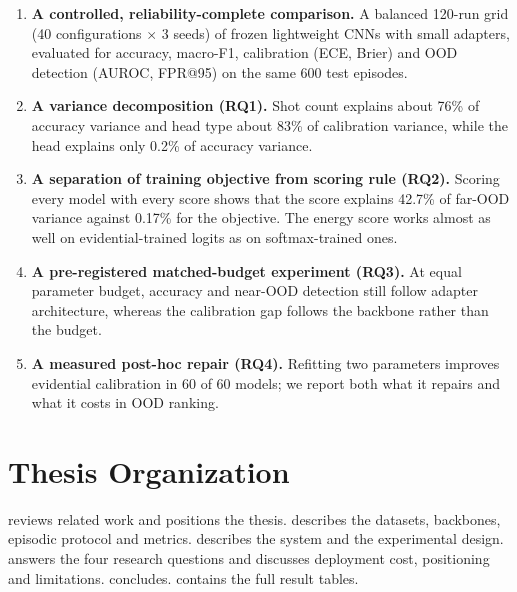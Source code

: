 \begin{enumerate}
\item \textbf{A controlled, reliability-complete comparison.} A balanced 120-run grid (40
configurations $\times$ 3 seeds) of frozen lightweight CNNs with small adapters, evaluated for accuracy,
macro-F1, calibration (ECE, Brier) and OOD detection (AUROC, FPR@95) on the same 600 test episodes.
\item \textbf{A variance decomposition (RQ1).} Shot count explains about 76\% of accuracy variance and
head type about 83\% of calibration variance, while the head explains only 0.2\% of accuracy variance.
\item \textbf{A separation of training objective from scoring rule (RQ2).} Scoring every model with
every score shows that the score explains 42.7\% of far-OOD variance against 0.17\% for the objective.
The energy score works almost as well on evidential-trained logits as on softmax-trained ones.
\item \textbf{A pre-registered matched-budget experiment (RQ3).} At equal parameter budget, accuracy and
near-OOD detection still follow adapter architecture, whereas the calibration gap follows the backbone
rather than the budget.
\item \textbf{A measured post-hoc repair (RQ4).} Refitting two parameters improves evidential
calibration in 60 of 60 models; we report both what it repairs and what it costs in OOD ranking.
\end{enumerate}

\section{Thesis Organization}

 reviews related work and positions the thesis.  describes the datasets,
backbones, episodic protocol and metrics.  describes the system and the experimental
design.  answers the four research questions and discusses deployment cost,
positioning and limitations.  concludes.  contains the full result
tables.
